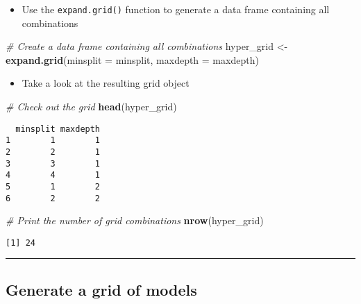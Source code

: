 \documentclass[
]{book}
\newenvironment{Shaded}{\begin{snugshade}}{\end{snugshade}}
\newcommand{\CommentTok}[1]{\textcolor[rgb]{0.56,0.35,0.01}{\textit{#1}}}
\newcommand{\DataTypeTok}[1]{\textcolor[rgb]{0.13,0.29,0.53}{#1}}
\newcommand{\KeywordTok}[1]{\textcolor[rgb]{0.13,0.29,0.53}{\textbf{#1}}}
\newcommand{\NormalTok}[1]{#1}
\newcommand{\StringTok}[1]{\textcolor[rgb]{0.31,0.60,0.02}{#1}}
\providecommand{\tightlist}{%
  \setlength{\itemsep}{0pt}\setlength{\parskip}{0pt}}
\begin{document}
\begin{itemize}
\tightlist
\item
  Use the \texttt{expand.grid()} function to generate a data frame containing all combinations
\end{itemize}

\begin{Shaded}
\begin{Highlighting}[]
\CommentTok{# Create a data frame containing all combinations }
\NormalTok{hyper_grid <-}\StringTok{ }\KeywordTok{expand.grid}\NormalTok{(}\DataTypeTok{minsplit =}\NormalTok{ minsplit, }\DataTypeTok{maxdepth =}\NormalTok{ maxdepth)}
\end{Highlighting}
\end{Shaded}

\begin{itemize}
\tightlist
\item
  Take a look at the resulting grid object
\end{itemize}

\begin{Shaded}
\begin{Highlighting}[]
\CommentTok{# Check out the grid}
\KeywordTok{head}\NormalTok{(hyper_grid)}
\end{Highlighting}
\end{Shaded}

\begin{verbatim}
  minsplit maxdepth
1        1        1
2        2        1
3        3        1
4        4        1
5        1        2
6        2        2
\end{verbatim}

\begin{Shaded}
\begin{Highlighting}[]
\CommentTok{# Print the number of grid combinations}
\KeywordTok{nrow}\NormalTok{(hyper_grid)}
\end{Highlighting}
\end{Shaded}

\begin{verbatim}
[1] 24
\end{verbatim}

\begin{center}\rule{0.5\linewidth}{0.5pt}\end{center}

\hypertarget{generate-a-grid-of-models}{%
\subsection{Generate a grid of models}\label{generate-a-grid-of-models}}
\end{document}
